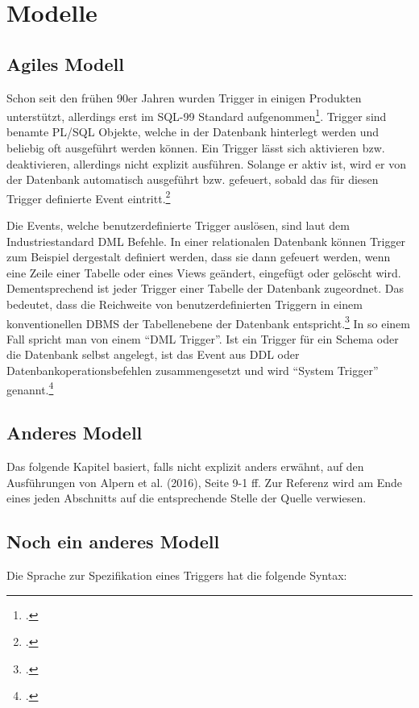 \newpage
\section{Modelle}
\subsection{Agiles Modell}
Schon seit den frühen 90er Jahren wurden Trigger in einigen Produkten unterstützt, allerdings erst im SQL-99 Standard aufgenommen\footcite[Vgl.][2]{shao2006triggers}. Trigger sind benamte PL/SQL Objekte, welche in der Datenbank hinterlegt werden und beliebig oft ausgeführt werden können. Ein Trigger lässt sich aktivieren bzw. deaktivieren, allerdings nicht explizit ausführen. Solange er aktiv ist, wird er von der Datenbank automatisch ausgeführt bzw. gefeuert, sobald das für diesen Trigger definierte Event eintritt.\footcite[Vgl.][S. 9-1 f.]{oracle}

Die Events, welche benutzerdefinierte Trigger auslösen, sind laut dem Industriestandard DML Befehle. In einer relationalen Datenbank können Trigger zum Beispiel dergestalt definiert werden, dass sie dann gefeuert werden, wenn eine Zeile einer Tabelle oder eines Views geändert, eingefügt oder gelöscht wird. Dementsprechend ist jeder Trigger einer Tabelle der Datenbank zugeordnet. Das bedeutet, dass die Reichweite von benutzerdefinierten Triggern in einem konventionellen DBMS der Tabellenebene der Datenbank entspricht.\footcite[Vgl.][]{samu2002database} In so einem Fall spricht man von einem "`DML Trigger"'. Ist ein Trigger für ein Schema oder die Datenbank selbst angelegt, ist das Event aus DDL oder Datenbankoperationsbefehlen zusammengesetzt und wird "`System Trigger"' genannt.\footcite[Vgl.][9-2]{oracle}





\subsection{Anderes Modell}
Das folgende Kapitel basiert, falls nicht explizit anders erwähnt, auf den Ausführungen von Alpern et al. (2016), Seite 9-1 ff. Zur Referenz wird am Ende eines jeden Abschnitts auf die entsprechende Stelle der Quelle verwiesen.




\subsection{Noch ein anderes Modell}
Die Sprache zur Spezifikation eines Triggers hat die folgende Syntax:



